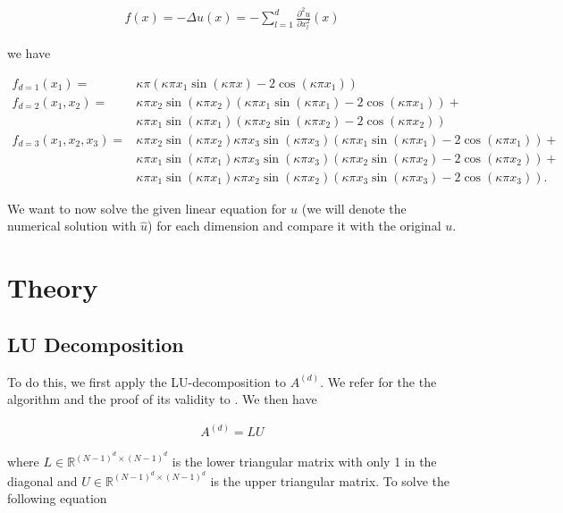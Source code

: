 \documentclass[refman]{article}
\theoremstyle{definition}
\begin{document}
\begin{align*}
	f(x) = - \Delta u(x) = -\sum_{l = 1}^d \frac{\partial^2 u}{\partial x_l^2} (x)
\end{align*}

we have

\begin{align*}
	f_{d=1} (x_1) =& \kappa \pi \left( \kappa \pi x_1 \sin ( \kappa \pi x ) - 2 \cos( \kappa \pi x_1) \right) \\
%	
	f_{d=2} (x_1, x_2) =& \kappa \pi x_2 \sin( \kappa \pi x_2) \left(  \kappa \pi x_1 \sin(\kappa \pi x_1) - 2 \cos ( \kappa \pi x_1) \right) + \\ 
	& \kappa \pi x_1 \sin( \kappa \pi x_1) \left(  \kappa \pi x_2 \sin(\kappa \pi x_2) - 2 \cos ( \kappa \pi x_2) \right) \\
%
	f_{d=3} (x_1, x_2, x_3) =& \kappa \pi x_2 \sin( \kappa \pi x_2) \kappa \pi x_3 \sin(\kappa \pi x_3)  \left(  \kappa \pi x_1 \sin(\kappa \pi x_1) - 2 \cos ( \kappa \pi x_1) \right) + \\
	& \kappa \pi x_1 \sin( \kappa \pi x_1) \kappa \pi x_3 \sin(\kappa \pi x_3)  \left(  \kappa \pi x_2 \sin(\kappa \pi x_2) - 2 \cos ( \kappa \pi x_2) \right) + \\
	& \kappa \pi x_1 \sin( \kappa \pi x_1) \kappa \pi x_2 \sin(\kappa \pi x_2)  \left(  \kappa \pi x_3 \sin(\kappa \pi x_3) - 2 \cos ( \kappa \pi x_3) \right) \text{.}
\end{align*}

We want to now solve the given linear equation for \(u\) (we will denote the numerical solution with \(\hat{u}\)) for each dimension and compare it with the original \(u\).

\section{Theory}

\subsection{LU Decomposition}

To do this, we first apply the LU-decomposition to \(A^{(d)}\). We refer for the the algorithm and the proof of its validity to \cite{nla}. We then have

\begin{align*}
	A^{(d)} = LU
\end{align*}

where \(L \in \mathbb{R}^{(N-1)^d \times (N-1)^d}\) is the lower triangular matrix with only 1 in the diagonal and \(U \in \mathbb{R}^{(N-1)^d \times (N-1)^d}\) is the upper triangular matrix. To solve the following equation
\end{document}
